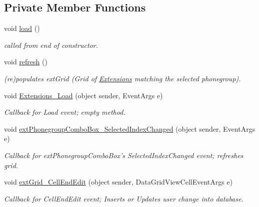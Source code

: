 \subsection*{Private Member Functions}
\begin{DoxyCompactItemize}
\item 
void \hyperlink{class_ias_pbx_config_1_1_extensions_ae4bb3f156ed11b990645abf3ec68e168}{load} ()
\begin{DoxyCompactList}\small\item\em called from end of constructor. \item\end{DoxyCompactList}\item 
void \hyperlink{class_ias_pbx_config_1_1_extensions_a701d940ae6c6d38e9bc691af071d091b}{refresh} ()
\begin{DoxyCompactList}\small\item\em (re)populates extGrid (Grid of \hyperlink{class_ias_pbx_config_1_1_extensions}{Extensions} matching the selected phonegroup). \item\end{DoxyCompactList}\item 
void \hyperlink{class_ias_pbx_config_1_1_extensions_a70664e1f909e49a8d06a4975c33fb119}{Extensions\_\-Load} (object sender, EventArgs e)
\begin{DoxyCompactList}\small\item\em Callback for Load event; empty method. \item\end{DoxyCompactList}\item 
void \hyperlink{class_ias_pbx_config_1_1_extensions_ac6212ae4230632279db1d1ddbafe463a}{extPhonegroupComboBox\_\-SelectedIndexChanged} (object sender, EventArgs e)
\begin{DoxyCompactList}\small\item\em Callback for extPhonegroupComboBox's SelectedIndexChanged event; refreshes grid. \item\end{DoxyCompactList}\item 
void \hyperlink{class_ias_pbx_config_1_1_extensions_a3fd06e7a96ab4f85614ce3e556e626ae}{extGrid\_\-CellEndEdit} (object sender, DataGridViewCellEventArgs e)
\begin{DoxyCompactList}\small\item\em Callback for CellEndEdit event; Inserts or Updates user change into database. \item\end{DoxyCompactList}\item 

\end{DoxyCompactItemize}

